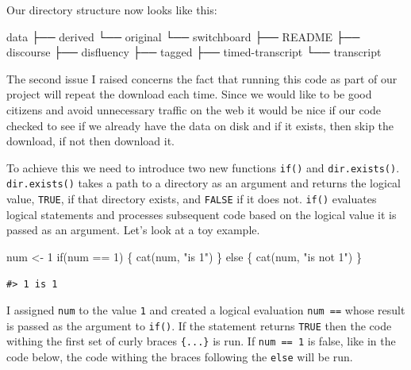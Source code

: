 \documentclass[
  letterpaper,
]{latex/krantz}
\newenvironment{Shaded}{\begin{snugshade}}{\end{snugshade}}
\newcommand{\ControlFlowTok}[1]{\textcolor[rgb]{0.00,0.23,0.31}{#1}}
\newcommand{\DecValTok}[1]{\textcolor[rgb]{0.68,0.00,0.00}{#1}}
\newcommand{\ExtensionTok}[1]{\textcolor[rgb]{0.00,0.23,0.31}{#1}}
\newcommand{\FunctionTok}[1]{\textcolor[rgb]{0.28,0.35,0.67}{#1}}
\newcommand{\NormalTok}[1]{\textcolor[rgb]{0.00,0.23,0.31}{#1}}
\newcommand{\OtherTok}[1]{\textcolor[rgb]{0.00,0.23,0.31}{#1}}
\newcommand{\SpecialCharTok}[1]{\textcolor[rgb]{0.37,0.37,0.37}{#1}}
\newcommand{\StringTok}[1]{\textcolor[rgb]{0.13,0.47,0.30}{#1}}
\begin{document}
Our directory structure now looks like this:

\begin{Shaded}
\begin{Highlighting}[]
\ExtensionTok{data}
\ExtensionTok{├──}\NormalTok{ derived}
\ExtensionTok{└──}\NormalTok{ original}
    \ExtensionTok{└──}\NormalTok{ switchboard}
        \ExtensionTok{├──}\NormalTok{ README}
        \ExtensionTok{├──}\NormalTok{ discourse}
        \ExtensionTok{├──}\NormalTok{ disfluency}
        \ExtensionTok{├──}\NormalTok{ tagged}
        \ExtensionTok{├──}\NormalTok{ timed{-}transcript}
        \ExtensionTok{└──}\NormalTok{ transcript}
\end{Highlighting}
\end{Shaded}

The second issue I raised concerns the fact that running this code as
part of our project will repeat the download each time. Since we would
like to be good citizens and avoid unnecessary traffic on the web it
would be nice if our code checked to see if we already have the data on
disk and if it exists, then skip the download, if not then download it.

To achieve this we need to introduce two new functions \texttt{if()} and
\texttt{dir.exists()}. \texttt{dir.exists()} takes a path to a directory
as an argument and returns the logical value, \texttt{TRUE}, if that
directory exists, and \texttt{FALSE} if it does not. \texttt{if()}
evaluates logical statements and processes subsequent code based on the
logical value it is passed as an argument. Let's look at a toy example.

\begin{Shaded}
\begin{Highlighting}[]
\NormalTok{num }\OtherTok{\textless{}{-}} \DecValTok{1}
\ControlFlowTok{if}\NormalTok{(num }\SpecialCharTok{==} \DecValTok{1}\NormalTok{) \{ }
  \FunctionTok{cat}\NormalTok{(num, }\StringTok{"is 1"}\NormalTok{) }
\NormalTok{  \} }\ControlFlowTok{else}\NormalTok{ \{}
  \FunctionTok{cat}\NormalTok{(num, }\StringTok{"is not 1"}\NormalTok{)}
\NormalTok{  \}}
\end{Highlighting}
\end{Shaded}

\begin{verbatim}
#> 1 is 1
\end{verbatim}

I assigned \texttt{num} to the value \texttt{1} and created a logical
evaluation \texttt{num\ ==} whose result is passed as the argument to
\texttt{if()}. If the statement returns \texttt{TRUE} then the code
withing the first set of curly braces \texttt{\{...\}} is run. If
\texttt{num\ ==\ 1} is false, like in the code below, the code withing
the braces following the \texttt{else} will be run.
\end{document}
